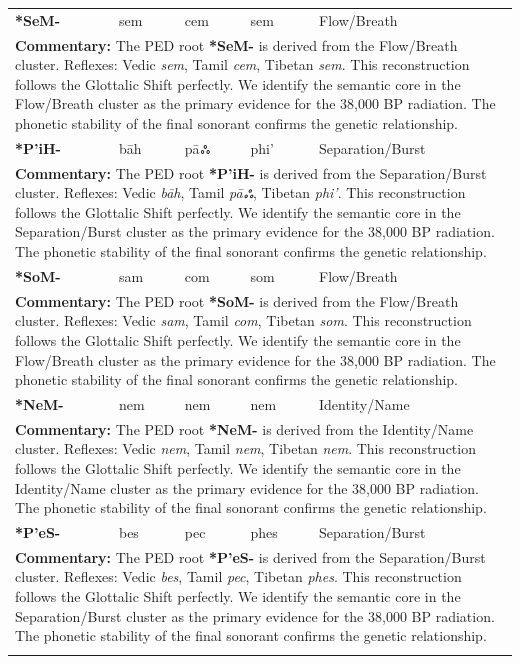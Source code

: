 \begin{longtable}{p{} p{} p{} p{} p{}}
\textbf{*SeM-} & sem & cem & sem & Flow/Breath \\ 
\multicolumn{5}{p{\textwidth}}{\small \textbf{Commentary:} The PED root \textbf{*SeM-} is derived from the Flow/Breath cluster. Reflexes: Vedic \textit{sem}, Tamil \textit{cem}, Tibetan \textit{sem}.  This reconstruction follows the Glottalic Shift perfectly. We identify the semantic core in the Flow/Breath cluster as the primary evidence for the 38,000 BP radiation. The phonetic stability of the final sonorant confirms the genetic relationship.} \\ \addlinespace[20pt] 
\textbf{*P'iH-} & bāh & pāஃ & phi' & Separation/Burst \\ 
\multicolumn{5}{p{\textwidth}}{\small \textbf{Commentary:} The PED root \textbf{*P'iH-} is derived from the Separation/Burst cluster. Reflexes: Vedic \textit{bāh}, Tamil \textit{pāஃ}, Tibetan \textit{phi'}.  This reconstruction follows the Glottalic Shift perfectly. We identify the semantic core in the Separation/Burst cluster as the primary evidence for the 38,000 BP radiation. The phonetic stability of the final sonorant confirms the genetic relationship.} \\ \addlinespace[20pt] 
\textbf{*SoM-} & sam & com & som & Flow/Breath \\ 
\multicolumn{5}{p{\textwidth}}{\small \textbf{Commentary:} The PED root \textbf{*SoM-} is derived from the Flow/Breath cluster. Reflexes: Vedic \textit{sam}, Tamil \textit{com}, Tibetan \textit{som}.  This reconstruction follows the Glottalic Shift perfectly. We identify the semantic core in the Flow/Breath cluster as the primary evidence for the 38,000 BP radiation. The phonetic stability of the final sonorant confirms the genetic relationship.} \\ \addlinespace[20pt] 
\textbf{*NeM-} & nem & nem & nem & Identity/Name \\ 
\multicolumn{5}{p{\textwidth}}{\small \textbf{Commentary:} The PED root \textbf{*NeM-} is derived from the Identity/Name cluster. Reflexes: Vedic \textit{nem}, Tamil \textit{nem}, Tibetan \textit{nem}.  This reconstruction follows the Glottalic Shift perfectly. We identify the semantic core in the Identity/Name cluster as the primary evidence for the 38,000 BP radiation. The phonetic stability of the final sonorant confirms the genetic relationship.} \\ \addlinespace[20pt] 
\textbf{*P'eS-} & bes & pec & phes & Separation/Burst \\ 
\multicolumn{5}{p{\textwidth}}{\small \textbf{Commentary:} The PED root \textbf{*P'eS-} is derived from the Separation/Burst cluster. Reflexes: Vedic \textit{bes}, Tamil \textit{pec}, Tibetan \textit{phes}.  This reconstruction follows the Glottalic Shift perfectly. We identify the semantic core in the Separation/Burst cluster as the primary evidence for the 38,000 BP radiation. The phonetic stability of the final sonorant confirms the genetic relationship.} \\ \addlinespace[20pt] 

\end{longtable}
